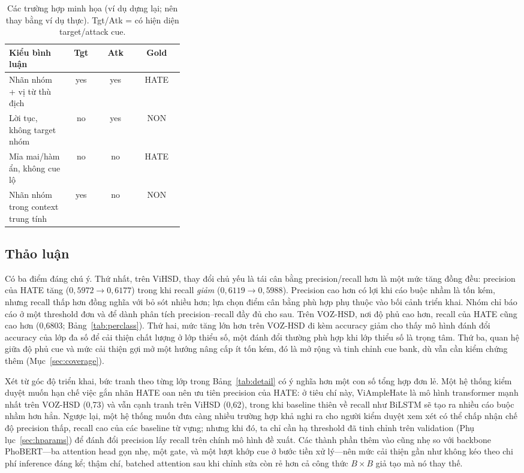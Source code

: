 \documentclass[11pt]{article}
\begin{document}
\begin{table}[!t]
  \centering
  \small
  \begin{tabular}{p{0.34\linewidth}ccc}
    \toprule
    \textbf{Kiểu bình luận} & \textbf{Tgt} & \textbf{Atk} & \textbf{Gold} \\
    \midrule
    Nhãn nhóm + vị từ thù địch       & yes & yes & HATE \\
    Lời tục, không target nhóm       & no  & yes & NON \\
    Mỉa mai/hàm ẩn, không cue lộ     & no  & no  & HATE \\
    Nhãn nhóm trong context trung tính & yes & no & NON \\
    \bottomrule
  \end{tabular}
  \caption{Các trường hợp minh họa (ví dụ dựng lại; nên thay bằng ví dụ thực). Tgt/Atk = có hiện diện target/attack cue.}
  \label{tab:qual}
\end{table}

\subsection{Thảo luận}
Có ba điểm đáng chú ý. Thứ nhất, trên ViHSD, thay đổi chủ yếu là tái cân bằng precision/recall hơn là một mức tăng đồng đều: precision của HATE tăng ($0{,}5972\!\to\!0{,}6177$) trong khi recall \emph{giảm} ($0{,}6119\!\to\!0{,}5988$). Precision cao hơn có lợi khi cáo buộc nhầm là tốn kém, nhưng recall thấp hơn đồng nghĩa với bỏ sót nhiều hơn; lựa chọn điểm cân bằng phù hợp phụ thuộc vào bối cảnh triển khai. Nhóm chỉ báo cáo ở một threshold đơn và để dành phân tích precision--recall đầy đủ cho sau. Trên VOZ-HSD, nơi độ phủ cao hơn, recall của HATE cũng cao hơn (0,6803; Bảng~\ref{tab:perclass}). Thứ hai, mức tăng lớn hơn trên VOZ-HSD đi kèm accuracy giảm cho thấy mô hình đánh đổi accuracy của lớp đa số để cải thiện chất lượng ở lớp thiểu số, một đánh đổi thường phù hợp khi lớp thiểu số là trọng tâm. Thứ ba, quan hệ giữa độ phủ cue và mức cải thiện gợi mở một hướng nâng cấp ít tốn kém, đó là mở rộng và tinh chỉnh cue bank, dù vẫn cần kiểm chứng thêm (Mục~\ref{sec:coverage}).

Xét từ góc độ triển khai, bức tranh theo từng lớp trong Bảng~\ref{tab:detail} có ý nghĩa hơn một con số tổng hợp đơn lẻ. Một hệ thống kiểm duyệt muốn hạn chế việc gắn nhãn HATE oan nên ưu tiên precision của HATE: ở tiêu chí này, ViAmpleHate là mô hình transformer mạnh nhất trên VOZ-HSD (0,73) và vẫn cạnh tranh trên ViHSD (0,62), trong khi baseline thiên về recall như BiLSTM sẽ tạo ra nhiều cáo buộc nhầm hơn hẳn. Ngược lại, một hệ thống muốn đưa càng nhiều trường hợp khả nghi ra cho người kiểm duyệt xem xét có thể chấp nhận chế độ precision thấp, recall cao của các baseline từ vựng; nhưng khi đó, ta chỉ cần hạ threshold đã tinh chỉnh trên validation (Phụ lục~\ref{sec:hparams}) để đánh đổi precision lấy recall trên chính mô hình đề xuất. Các thành phần thêm vào cũng nhẹ so với backbone PhoBERT---ba attention head gọn nhẹ, một gate, và một lượt khớp cue ở bước tiền xử lý---nên mức cải thiện gần như không kéo theo chi phí inference đáng kể; thậm chí, batched attention sau khi chỉnh sửa còn rẻ hơn cả công thức $B\times B$ giả tạo mà nó thay thế.
\end{document}
